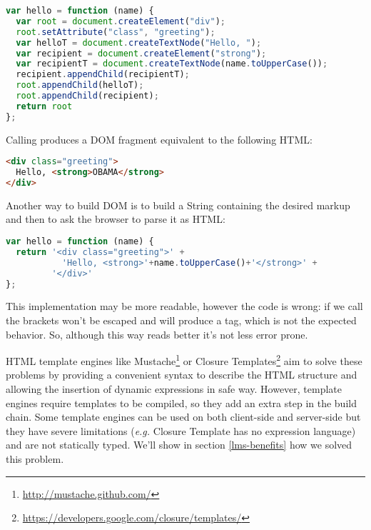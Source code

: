 \documentclass[american,english,runningheads]{llncs}
\newcommand{\eg}{\emph{e.g.}}
\begin{document}
\begin{lstlisting}[language=JavaScript,label=dom-api,caption=DOM fragment creation using the native API]
var hello = function (name) {
  var root = document.createElement("div");
  root.setAttribute("class", "greeting");
  var helloT = document.createTextNode("Hello, ");
  var recipient = document.createElement("strong");
  var recipientT = document.createTextNode(name.toUpperCase());
  recipient.appendChild(recipientT);
  root.appendChild(helloT);
  root.appendChild(recipient);
  return root
};
\end{lstlisting}

Calling  produces a DOM fragment equivalent to the following HTML:

\begin{lstlisting}[language=HTML]
<div class="greeting">
  Hello, <strong>OBAMA</strong>
</div>
\end{lstlisting}

Another way to build DOM is to build a String containing the desired markup and then to ask the browser to parse it as HTML:

\begin{lstlisting}[language=JavaScript]
var hello = function (name) {
  return '<div class="greeting">' +
           'Hello, <strong>'+name.toUpperCase()+'</strong>' +
         '</div>'
};
\end{lstlisting}

This implementation may be more readable, however the code is wrong: if we call  the brackets won’t be escaped and will produce a  tag, which is not the expected behavior. So, although this way reads better it’s not less error prone.

HTML template engines like Mustache\footnote{\href{http://mustache.github.com/}{http://mustache.github.com/}} or Closure Templates\footnote{\href{https://developers.google.com/closure/templates/}{https://developers.google.com/closure/templates/}} aim to solve these problems by providing a convenient syntax to describe the HTML structure and allowing the insertion of dynamic expressions in safe way. However, template engines require templates to be compiled, so they add an extra step in the build chain. Some template engines can be used on both client-side and server-side but they have severe limitations (\eg{} Closure Template has no expression language) and are not statically typed. We’ll show in section \ref{lms-benefits} how we solved this problem.
\end{document}
